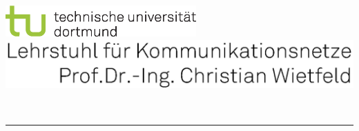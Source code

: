 \begin{titlepage}
\begin{addmargin}[-1cm]{-3cm}%
		\includegraphics*[width=7.3cm]{gfx/tu_rgb}
		\includegraphics*[scale = 0.57]{gfx/LSKN}
\begin{minipage}[b]{17cm}
	\vspace{1.2cm}%
\end{minipage}
		~
	\vspace{0.5cm}

	\hrule
\begin{center}
	{\normalsize{}\fontsize{14}{14}\selectfont 
		{\normalsize\fontsize{14}{14}\selectfont 
			
			\vspace{2.8cm}%
			
			{\large \textbf{\myDocType}}

			\vspace{4.5cm}%

			\parbox{\textwidth}{%
				\begin{center}
					\LARGE\textbf{%
						\myTitle
						}
				\end{center}
			}

			\vspace{5cm}%

			{\fontsize{13pt}{12} \selectfont%
				\textbf{\myDegree \myName}
			}\\
			\vspace{3cm}

}}
\end{center}
\end{addmargin}
\end{titlepage}
